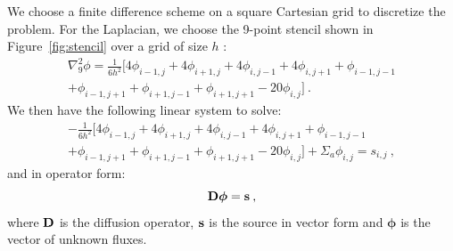 \documentclass{mc2013}
\begin{document}
We choose a finite difference scheme on a square Cartesian grid to
discretize the problem. For the Laplacian, we choose the 9-point
stencil shown in Figure~\ref{fig:stencil} over a grid of size $h$
\cite{leveque_finite_2007}:
\begin{multline}
  \nabla^2_9\phi = \frac{1}{6h^2}[4 \phi_{i-1,j} + 4 \phi_{i+1,j}
    + 4 \phi_{i,j-1} + 4 \phi_{i,j+1} + \phi_{i-1,j-1}\\ +
    \phi_{i-1,j+1} + \phi_{i+1,j-1} + \phi_{i+1,j+1} - 20
    \phi_{i,j}]\:.
  \label{eq:nine_point_stencil}
\end{multline}
We then have the following linear system to solve:
\begin{multline}
  -\frac{1}{6h^2}[4 \phi_{i-1,j} + 4 \phi_{i+1,j} + 4
    \phi_{i,j-1} + 4 \phi_{i,j+1} + \phi_{i-1,j-1}\\ + \phi_{i-1,j+1}
    + \phi_{i+1,j-1} + \phi_{i+1,j+1} - 20 \phi_{i,j}] + \Sigma_a
  \phi_{i,j} = s_{i,j}\:,
  \label{eq:fd_system}
\end{multline}
and in operator form:
\begin{equation}
  \mathbf{D}\boldsymbol{\phi}=\mathbf{s}\:,
  \label{eq:operator_system}
\end{equation}
where $\mathbf{D}$ is the diffusion operator, $\mathbf{s}$ is the source in
vector form and $\boldsymbol{\phi}$ is the vector of unknown fluxes.
\end{document}
